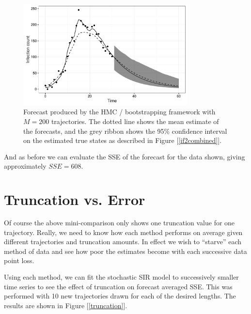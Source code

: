 	\begin{figure}
        \centering
        \captionsetup{width=.8\linewidth}
        \includegraphics[width=0.8\textwidth]{./images/hmcforecast.pdf}
        \caption{Forecast produced by the HMC / bootstrapping framework with $M = 200$ trajectories. The dotted line shows the mean estimate of the forecasts, and the grey ribbon shows the 95\% confidence interval on the estimated true states as described in Figure [\ref{if2combined}]. \label{hmcforecast}}
    \end{figure}

    And as before we can evaluate the SSE of the forecast for the data shown, giving approximately $SSE = 608$.


\section{Truncation vs. Error}

	Of course the above mini-comparison only shows one truncation value for one trajectory. Really, we need to know how each method performs on average given different trajectories and truncation amounts. In effect we wish to ``starve'' each method of data and see how poor the estimates become with each successive data point loss.

	Using each method, we can fit the stochastic SIR model to successively smaller time series to see the effect of truncation on forecast averaged SSE. This was performed with 10 new trajectories drawn for each of the desired lengths. The results are shown in Figure [\ref{truncation}].

